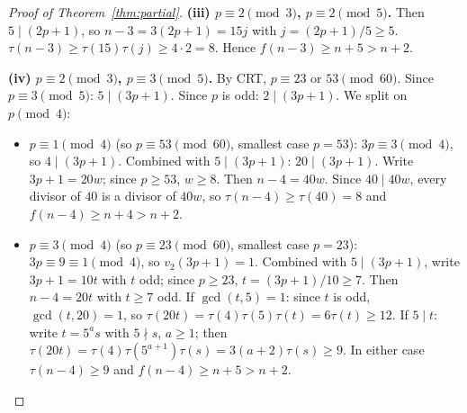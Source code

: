 \documentclass[11pt]{article}
\begin{document}
\begin{proof}[Proof of Theorem~\ref{thm:partial}]
\textbf{(iii) $p \equiv 2 \pmod{3}$, $p \equiv 2 \pmod{5}$.}
Then $5 \mid (2p+1)$, so $n-3 = 3(2p+1) = 15j$ with $j = (2p+1)/5 \ge 5$.
$\tau(n-3) \ge \tau(15)\tau(j) \ge 4 \cdot 2 = 8$.
Hence $f(n-3) \ge n+5 > n+2$.

\textbf{(iv) $p \equiv 2 \pmod{3}$, $p \equiv 3 \pmod{5}$.}
By CRT, $p \equiv 23$ or $53 \pmod{60}$.
Since $p \equiv 3 \pmod{5}$: $5 \mid (3p+1)$.  Since $p$ is odd: $2 \mid (3p+1)$.
We split on $p \pmod{4}$:
\begin{itemize}
  \item $p \equiv 1 \pmod{4}$ (so $p \equiv 53 \pmod{60}$, smallest case $p=53$):
        $3p \equiv 3 \pmod{4}$, so $4 \mid (3p+1)$.  Combined with $5 \mid (3p+1)$:
        $20 \mid (3p+1)$.  Write $3p+1 = 20w$; since $p \ge 53$, $w \ge 8$.
        Then $n-4 = 40w$.  Since $40 \mid 40w$, every divisor of $40$ is a divisor
        of $40w$, so $\tau(n-4) \ge \tau(40) = 8$ and $f(n-4) \ge n+4 > n+2$.
  \item $p \equiv 3 \pmod{4}$ (so $p \equiv 23 \pmod{60}$, smallest case $p=23$):
        $3p \equiv 9 \equiv 1 \pmod{4}$, so $v_2(3p+1) = 1$.
        Combined with $5 \mid (3p+1)$, write $3p+1 = 10t$ with $t$ odd;
        since $p \ge 23$, $t = (3p+1)/10 \ge 7$.
        Then $n-4 = 20t$ with $t \ge 7$ odd.
        If $\gcd(t,5)=1$: since $t$ is odd, $\gcd(t,20)=1$, so
        $\tau(20t) = \tau(4)\tau(5)\tau(t) = 6\tau(t) \ge 12$.
        If $5 \mid t$: write $t = 5^a s$ with $5 \nmid s$, $a \ge 1$;
        then $\tau(20t) = \tau(4)\tau(5^{a+1})\tau(s) = 3(a+2)\tau(s) \ge 9$.
        In either case $\tau(n-4) \ge 9$ and $f(n-4) \ge n+5 > n+2$.
\end{itemize}


\end{proof}
\end{document}
